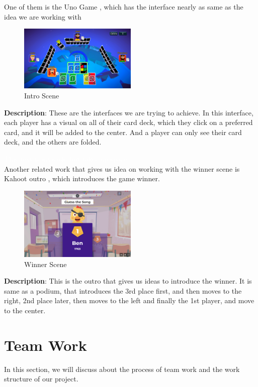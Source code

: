 \documentclass[conference]{IEEEtran}
\begin{document}
One of them is the Uno Game \cite{b2}, which has the interface nearly as same as the idea we are working with
\begin{figure}[h!]
    \centering
    \includegraphics[width=0.5\textwidth]{img/image.png} %
    \caption{Intro Scene}
    \label{fig:intro-scene}
\end{figure}

\textbf{Description}: These are the interfaces we are trying to achieve. In this interface, each player has a visual on all of their card deck, which they click on a preferred card, and it will be added to the center. And a player can only see their card deck, and the others are folded.

\textcolor{white}{This text is invisible but takes up space.} \\
Another related work that gives us idea on working with the winner scene is Kahoot outro \cite{b3}, which introduces the game winner.
\begin{figure}[h!]
    \centering
    \includegraphics[width=0.5\textwidth]{img/Screenshot 2025-01-14 134455.png} %
    \caption{Winner Scene}
    \label{fig:winner-scene}
\end{figure}

\textbf{Description}: This is the outro that gives us ideas to introduce the winner. It is same as a podium, that introduces the 3rd place first, and then moves to the right, 2nd place later, then moves to the left and finally the 1st player, and move to the center.

\section{Team Work}
In this section, we will discuss about the process of team work and the work structure of our project.
\end{document}
